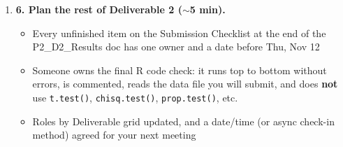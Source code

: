 \documentclass[12pt]{article}
\begin{document}
\begin{enumerate}
    \item[$\square$] \textbf{6. Plan the rest of Deliverable 2 ($\sim$5 min).}
    \begin{itemize}[nosep]
        \item[$\square$] Every unfinished item on the Submission Checklist at the end of the P2\_D2\_Results doc has one owner and a date before Thu, Nov 12
        \item[$\square$] Someone owns the final R code check: it runs top to bottom without errors, is commented, reads the data file you will submit, and does \textbf{not} use \texttt{t.test()}, \texttt{chisq.test()}, \texttt{prop.test()}, etc.
        \item[$\square$] Roles by Deliverable grid updated, and a date/time (or async check-in method) agreed for your next meeting
    \end{itemize}
\end{enumerate}
\end{document}
